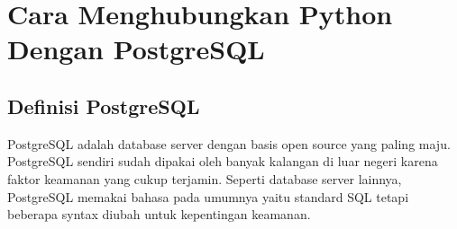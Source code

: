 \section{Cara Menghubungkan Python Dengan PostgreSQL}

\subsection{Definisi PostgreSQL}
\cite{momjian2001postgresql}PostgreSQL adalah database server dengan basis open source yang paling maju. PostgreSQL sendiri sudah dipakai oleh banyak kalangan di luar negeri karena faktor keamanan yang cukup terjamin. Seperti database server lainnya, PostgreSQL memakai bahasa pada umumnya yaitu standard SQL tetapi beberapa syntax diubah untuk kepentingan keamanan.